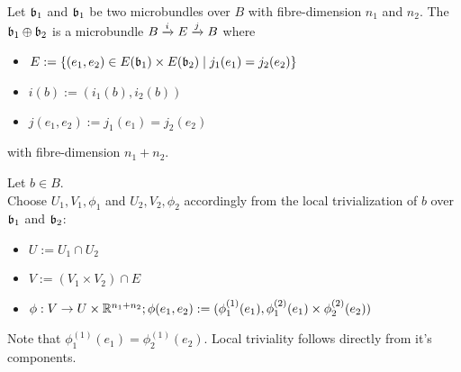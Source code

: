 \begin{mydefinition}
    Let $\bb_1$ and $\bb_1$ be two microbundles over $B$ with fibre-dimension $n_1$ and $n_2$.
    The  $\bb_1 \oplus \bb_2$ is a microbundle $\bundle{B}{E}{i}{j}$ where
    \begin{itemize}
        \item $E := \{ (e_1, e_2) \in E(\bb_1) \times E(\bb_2) \mid j_1(e_1) = j_2(e_2)\}$
        \item $i(b) := (i_1(b), i_2(b))$
        \item $j(e_1, e_2) := j_1(e_1) = j_2(e_2)$
    \end{itemize}
    with fibre-dimension $n_1 + n_2$.
\end{mydefinition}
\begin{myproof}
Let $b \in B$. \\
Choose $U_1, V_1, \phi_1$ and $U_2, V_2, \phi_2$ accordingly from the local trivialization of $b$ over $\bb_1$ and $\bb_2$:
\begin{itemize}
    \item $U := U_1 \cap U_2$
    \item $V := (V_1 \times V_2) \cap E$
    \item $\phi: V \to U \times \R^{n_1 + n_2}; \phi(e_1, e_2) := (\phi_1^{(1)}(e_1), \phi_1^{(2)}(e_1) \times  \phi_2^{(2)}(e_2))$
\end{itemize}
Note that $\phi_1^{(1)}(e_1) = \phi_2^{(1)}(e_2)$.
Local triviality follows directly from it's components.
\end{myproof}